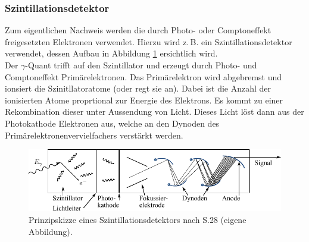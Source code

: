 \documentclass[a4paper,twoside,final]{article}
\begin{document}
\subsubsection{Szintillationsdetektor}
Zum eigentlichen Nachweis werden die durch Photo- oder Comptoneffekt freigesetzten Elektronen verwendet. Hierzu wird z.\,B. ein Szintillationsdetektor verwendet, dessen Aufbau in Abbildung \ref{fig:Szintillationsdetektor} ersichtlich wird.\\
Der $\gamma$-Quant trifft auf den Szintillator und erzeugt durch Photo- und Comptoneffekt Primärelektronen. Das Primärelektron wird abgebremst und ionsiert die Szinitllatoratome (oder regt sie an). Dabei ist die Anzahl der ionisierten Atome proprtional zur Energie des Elektrons. Es kommt zu einer Rekombination dieser unter Aussendung von Licht. Dieses Licht löst dann aus der Photokathode Elektronen aus, welche an den Dynoden des Primärelektronenvervielfachers verstärkt werden.
\begin{figure}[htp]
    \centering
    \includegraphics{Bilder/Szintillationsdetektor.pdf}
    \caption{Prinzipskizze eines Szintillationsdetektors nach \cite{Schatz} S.28 (eigene Abbildung).}
    \label{fig:Szintillationsdetektor}
\end{figure}
\end{document}
